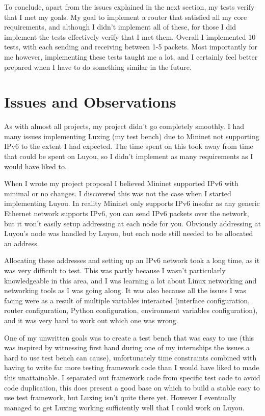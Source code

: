 \documentclass[12pt,a4paper,twoside,openright]{report}
\begin{document}
\bigskip

To conclude, apart from the issues explained in the next section, my tests verify that I met my goals.  My goal to implement a router that satisfied all my core requirements, and although I didn't implement all of these, for those I did implement the tests effectively verify that I met them.  Overall I implemented 10 tests, with each sending and receiving between 1-5 packets. Most importantly for me however, implementing these tests taught me a lot, and I certainly feel better prepared when I have to do something similar in the future.

\section{Issues and Observations}

As with almost all projects, my project didn't go completely smoothly. I had many issues implementing Luxing (my test bench) due to Mininet not supporting IPv6 to the extent I had expected. The time spent on this took away from time that could be spent on Luyou, so I didn't implement as many requirements as I would have liked to.

\bigskip

When I wrote my project proposal I believed Mininet supported IPv6 with minimal or no changes.  I discovered this was not the case when I started implementing Luyou.  In reality Mininet only supports IPv6 insofar as any generic Ethernet network supports IPv6, you can send IPv6 packets over the network, but it won't easily setup addressing at each node for you.  Obviously addressing at Luyou's node was handled by Luyou, but each node still needed to be allocated an address. 

Allocating these addresses and setting up an IPv6 network took a long time, as it was very difficult to test.  This was partly because I wasn't particularly knowledgeable in this area, and I was learning a lot about Linux networking and networking tools as I was going along. It was also because all the issues I was facing were as a result of multiple variables interacted (interface configuration, router configuration, Python configuration, environment variables configuration), and it was very hard to work out which one was wrong.  

One of my unwritten goals was to create a test bench that was easy to use (this was inspired by witnessing first hand during one of my internships the issues a hard to use test bench can cause), unfortunately time constraints combined with having to write far more testing framework code than I would have liked to made this unattainable.  I separated out framework code from specific test code to avoid code duplication, this does present a good base on which to build a stable easy to use test framework, but Luxing isn't quite there yet. However I eventually managed to get Luxing working sufficiently well that I could work on Luyou. 
\end{document}
